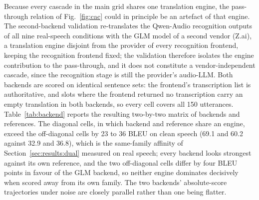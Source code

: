 Because every cascade in the main grid shares one translation engine, the
pass-through relation of Fig.~\ref{fig:cac} could in principle be an
artefact of that engine. The second-backend validation re-translates the
Qwen-Audio recognition outputs of all nine real-speech conditions with
the GLM model of a second vendor (Z.ai), a translation engine
disjoint from the provider of every recognition frontend, keeping the
recognition frontend fixed; the validation therefore isolates the engine
contribution to the pass-through, and it does not constitute a
vendor-independent cascade, since the recognition stage is still the
provider's audio-LLM. Both backends are scored on identical sentence
sets: the frontend's transcription list is authoritative, and slots where
the frontend returned no transcription carry an empty translation in
both backends, so every cell covers all 150 utterances.
Table~\ref{tab:backend} reports the resulting
two-by-two matrix of backends and references. The diagonal cells, in which
backend and reference share an engine, exceed the off-diagonal cells by 23
to 36 BLEU on clean speech (69.1 and 60.2 against 32.9 and 36.8), which is
the same-family affinity of Section~\ref{sec:results:dual} measured on
real speech; every backend looks strongest against its own reference, and
the two off-diagonal cells differ by four BLEU points in favour of the
GLM backend, so neither engine dominates decisively when scored away from
its own family. The two backends' absolute-score trajectories under noise are closely
parallel rather than one being flatter.

